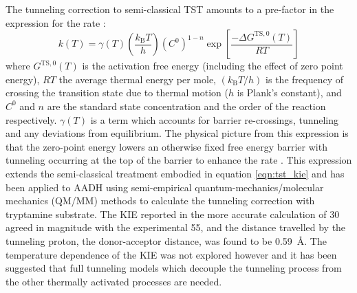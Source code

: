 The tunneling correction to semi-classical TST amounts to a pre-factor in the expression for the rate \cite{garciavilocaHowEnzymesWork2004}: 
\begin{equation}\label{eqn:tst}
k(T) =\gamma(T)\left(\frac{k_{\mathrm{B}} T}{h}\right)\left(C^{0}\right)^{1-n}\exp \left[\frac{-\Delta G^{\mathrm{TS}, 0}(T)}{R T}\right]
\end{equation}
where $G^{\mathrm{TS}, 0}(T)$ is the activation free energy (including the effect of zero point energy), $RT$ the average thermal energy per mole, $\left(k_{\mathrm{B}} T / h\right)$ is the frequency of crossing the transition state due to thermal motion ($h$ is Plank's constant), and $C^{0}$ and $n$ are the standard state concentration and the order of the reaction respectively. $\gamma(T)$ is a term which accounts for barrier re-crossings, tunneling and any deviations from equilibrium. The physical picture from this expression is that the zero-point energy lowers an otherwise fixed free energy barrier with tunneling occurring at the top of the barrier to enhance the rate \cite{garciavilocaHowEnzymesWork2004}. This expression extends the semi-classical treatment embodied in equation \ref{eqn:tst_kie} and has been applied to AADH \cite{masgrauAtomicDescriptionEnzyme2006, masgrauTunnelingClassicalPaths2007} using semi-empirical quantum-mechanics/molecular mechanics (QM/MM) methods to calculate the tunneling correction with tryptamine substrate. The KIE reported in the more accurate calculation \cite{masgrauTunnelingClassicalPaths2007} of \num{30} agreed in magnitude with the experimental \num{55}, and the distance travelled by the tunneling proton, the donor-acceptor distance, was found to be \SI{0.59}{\angstrom}. The temperature dependence of the KIE was not explored however and it has been suggested \cite{klinmanHydrogenTunnelingLinks2013, johannissenProtonTunnelingAromatic2007, klinmanbeyond2009, puMultidimensionalTunnelingRecrossing2006} that full tunneling models which decouple the tunneling process from the other thermally activated processes are needed. 

